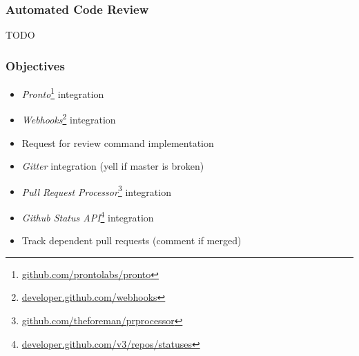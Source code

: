 \documentclass[10pt,xcolor=pdflatex]{beamer}
\begin{document}
\begin{frame}\frametitle{Automated Code Review}
    TODO
\end{frame}

\begin{frame}\frametitle{Objectives}
    \begin{itemize}
        \item \textit{Pronto}\footnote{\color{cyan}\href{https://github.com/prontolabs/pronto}{github.com/prontolabs/pronto}} integration\\[0.5em]
        \item \textit{Webhooks}\footnote{\color{cyan}\href{https://developer.github.com/webhooks}{developer.github.com/webhooks}} integration\\[0.5em]
        \item Request for review command implementation\\[0.5em]
        \item \textit{Gitter} integration (yell if master is broken)\\[0.5em]
        \item \textit{Pull Request Processor}\footnote{\color{cyan}\href{https://github.com/theforeman/prprocessor}{github.com/theforeman/prprocessor}} integration\\[0.5em]
        \item \textit{Github Status API}\footnote{\color{cyan}\href{https://developer.github.com/v3/repos/statuses}{developer.github.com/v3/repos/statuses}} integration\\[0.5em]
        \item Track dependent pull requests (comment if merged)
    \end{itemize}
\end{frame}

\end{document}
